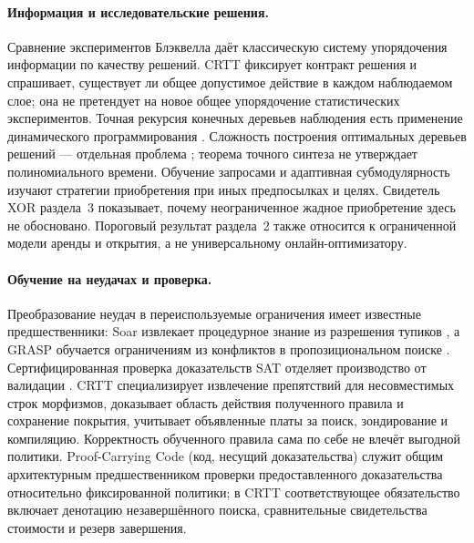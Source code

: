 \documentclass[10pt,a4paper]{article}
\begin{document}
\paragraph{Информация и исследовательские решения.}
Сравнение экспериментов Блэквелла \cite{blackwell1953} даёт классическую систему упорядочения информации по качеству решений. CRTT фиксирует контракт решения и спрашивает, существует ли общее допустимое действие в каждом наблюдаемом слое; она не претендует на новое общее упорядочение статистических экспериментов. Точная рекурсия конечных деревьев наблюдения есть применение динамического программирования \cite{bellman1957}. Сложность построения оптимальных деревьев решений --- отдельная проблема \cite{hyafil1976}; теорема точного синтеза не утверждает полиномиального времени. Обучение запросами \cite{angluin1988} и адаптивная субмодулярность \cite{golovin2011} изучают стратегии приобретения при иных предпосылках и целях. Свидетель XOR раздела~3 показывает, почему неограниченное жадное приобретение здесь не обосновано. Пороговый результат раздела~2 также относится к ограниченной модели аренды и открытия, а не универсальному онлайн-оптимизатору.

\paragraph{Обучение на неудачах и проверка.}
Преобразование неудач в переиспользуемые ограничения имеет известные предшественники: Soar извлекает процедурное знание из разрешения тупиков \cite{soar1987}, а GRASP обучается ограничениям из конфликтов в пропозициональном поиске \cite{grasp1999}. Сертифицированная проверка доказательств SAT отделяет производство от валидации \cite{lrat2017}. CRTT специализирует извлечение препятствий для несовместимых строк морфизмов, доказывает область действия полученного правила и сохранение покрытия, учитывает объявленные платы за поиск, зондирование и компиляцию. Корректность обученного правила сама по себе не влечёт выгодной политики. Proof-Carrying Code (код, несущий доказательства) \cite{necula1997} служит общим архитектурным предшественником проверки предоставленного доказательства относительно фиксированной политики; в CRTT соответствующее обязательство включает денотацию незавершённого поиска, сравнительные свидетельства стоимости и резерв завершения.
\end{document}
